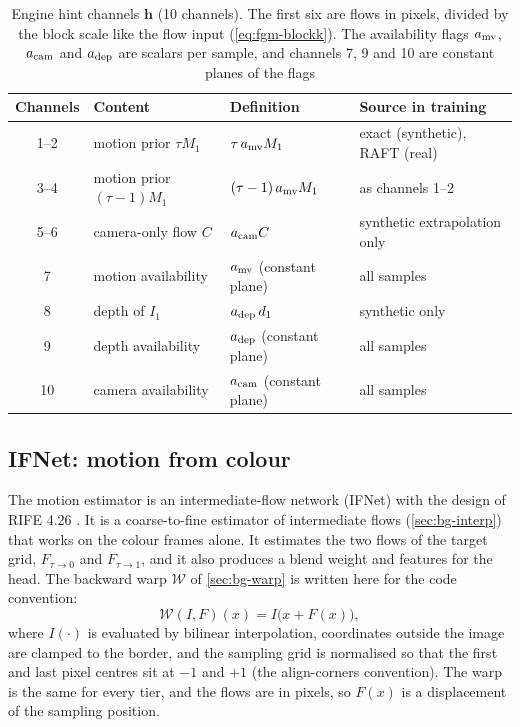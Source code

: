 \begin{table}[!htbp]
\caption{Engine hint channels $\mathbf h$ (10 channels). The first six are flows in pixels, divided by the block scale like the flow input (\cref{eq:fgm-blockk}). The availability flags $a_{\rm mv}$, $a_{\rm cam}$ and $a_{\rm dep}$ are scalars per sample, and channels 7, 9 and 10 are constant planes of the flags}\label{tab:fgm-hints}
\begin{tabular*}{\textwidth}{@{\extracolsep\fill}clll}
\toprule
Channels & Content & Definition & Source in training \\
\midrule
1--2 & motion prior $\tau M_1$ & $\tau\,a_{\rm mv}M_1$ & exact (synthetic), RAFT (real) \\
3--4 & motion prior $(\tau-1)M_1$ & $(\tau-1)\,a_{\rm mv}M_1$ & as channels 1--2 \\
5--6 & camera-only flow $C$ & $a_{\rm cam}C$ & synthetic extrapolation only \\
7 & motion availability & $a_{\rm mv}$ (constant plane) & all samples \\
8 & depth of $I_1$ & $a_{\rm dep}\,d_1$ & synthetic only \\
9 & depth availability & $a_{\rm dep}$ (constant plane) & all samples \\
10 & camera availability & $a_{\rm cam}$ (constant plane) & all samples \\
\bottomrule
\end{tabular*}
\end{table}

\subsection{IFNet: motion from colour}\label{sec:fgm-ifnet}

The motion estimator is an intermediate-flow network (IFNet) with the design of RIFE 4.26 \cite{huang2022rife}. It is a coarse-to-fine estimator of intermediate flows (\cref{sec:bg-interp}) that works on the colour frames alone. It estimates the two flows of the target grid, $F_{\tau\to0}$ and $F_{\tau\to1}$, and it also produces a blend weight and features for the head. The backward warp $\mathcal W$ of \cref{sec:bg-warp} is written here for the code convention:
\begin{equation}
\mathcal W(I,F)(x)=I\big(x+F(x)\big),\label{eq:fgm-warp}
\end{equation}
where $I(\cdot)$ is evaluated by bilinear interpolation, coordinates outside the image are clamped to the border, and the sampling grid is normalised so that the first and last pixel centres sit at $-1$ and $+1$ (the align-corners convention). The warp is the same for every tier, and the flows are in pixels, so $F(x)$ is a displacement of the sampling position.

